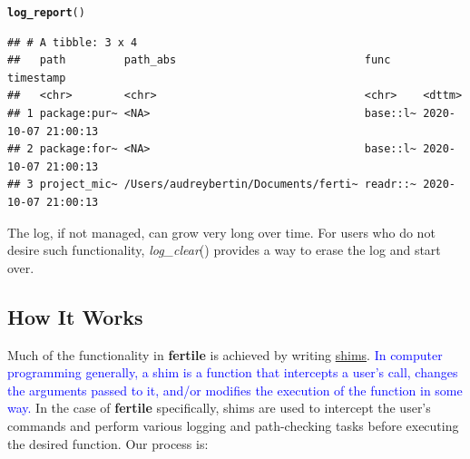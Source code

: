 \documentclass[APA,LATO1COL]{WileyNJD-v2}\usepackage[]{graphicx}\usepackage[]{color}
\makeatletter
\newcommand{\hlstd}[1]{\textcolor[rgb]{0.345,0.345,0.345}{#1}}%
\newcommand{\hlkwd}[1]{\textcolor[rgb]{0.737,0.353,0.396}{\textbf{#1}}}%
\newenvironment{kframe}{%
 \def\at@end@of@kframe{}%
 \ifinner\ifhmode%
  \def\at@end@of@kframe{\end{minipage}}%
  \begin{minipage}{\columnwidth}%
 \fi\fi%
 \def\FrameCommand##1{\hskip\@totalleftmargin \hskip-\fboxsep
 \colorbox{shadecolor}{##1}\hskip-\fboxsep
     \hskip-\linewidth \hskip-\@totalleftmargin \hskip\columnwidth}%
 \MakeFramed {\advance\hsize-\width
   \@totalleftmargin\z@ \linewidth\hsize
   \@setminipage}}%
 {\par\unskip\endMakeFramed%
 \at@end@of@kframe}
\newenvironment{knitrout}{}{} %
\newcommand{\pkg}[1]{\textbf{#1}}
\newcommand{\func}[1]{\textit{#1}()}
\makeatother
\begin{document}
\begin{knitrout}
\color{fgcolor}\begin{kframe}
\begin{alltt}
\hlkwd{log_report}\hlstd{()}
\end{alltt}
\begin{verbatim}
## # A tibble: 3 x 4
##   path         path_abs                             func     timestamp          
##   <chr>        <chr>                                <chr>    <dttm>             
## 1 package:pur~ <NA>                                 base::l~ 2020-10-07 21:00:13
## 2 package:for~ <NA>                                 base::l~ 2020-10-07 21:00:13
## 3 project_mic~ /Users/audreybertin/Documents/ferti~ readr::~ 2020-10-07 21:00:13
\end{verbatim}
\end{kframe}
\end{knitrout}

The log, if not managed, can grow very long over time. For users who do not desire such functionality, \func{log\_clear} provides a way to erase the log and start over.




\subsection{How It Works}

Much of the functionality in \pkg{fertile} is achieved by writing \href{https://en.wikipedia.org/wiki/Shim_(computing)}{shims}. \textcolor{blue}{{In computer programming generally, a shim is a function that intercepts a user's call, changes the arguments passed to it, and/or modifies the execution of the function in some way.}} In the case of \pkg{fertile} specifically, shims are used to intercept the user's commands and perform various logging and path-checking tasks before executing the desired function. Our process is:
\end{document}

